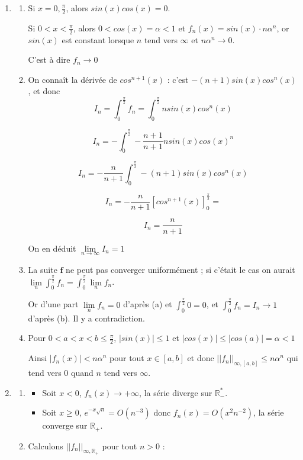 \documentclass[]{article}
\begin{document}
\begin{enumerate}

\item
\begin{enumerate}
	\item Si $x = 0, \frac{\pi}{2}$, alors $sin(x)cos(x) = 0$.
	
	Si $0 < x < \frac{\pi}{2}$, alors $0 < cos(x) = \alpha < 1$ et $f_n(x)=sin(x) \cdot n \alpha^n$, or $sin(x)$ est constant lorsque $n$ tend vers $\infty$ et $n \alpha^n \to 0$.
	
	C'est à dire $f_n \to 0$
	
	\item On connaît la dérivée de $cos^{n+1}(x)$ : c'est $-(n+1)sin(x)cos^n(x)$, et donc $$I_n = \int_{0}^{\frac{\pi}{2}}f_n = \int_{0}^{\frac{\pi}{2}}n sin(x) cos^n(x)$$
	
	$$I_n = - \int_{0}^{\frac{\pi}{2}}-\frac{n+1}{n+1} n sin(x) cos(x)^n$$
	
	$$I_n = -\frac{n}{n+1}\int_{0}^{\frac{\pi}{2}} - (n+1) sin(x) cos^n(x)$$
	
	$$I_n = - \frac{n}{n+1}[cos^{n+1}(x)]^{\frac{\pi}{2}}_0 = $$
	
	$$I_n=\frac{n}{n+1}$$
	
	On en déduit $\lim\limits_{n \to \infty} I_n = 1$
	
	\item La suite $\textbf{f}$ ne peut pas converger uniformément ; si c'était le cas on aurait $\displaystyle \lim\limits_{n} \int_{0}^{\frac{\pi}{2}}f_n = \int_{0}^{\frac{\pi}{2}} \lim\limits_{n}f_n$.
	
	Or d'une part $\displaystyle \lim\limits_{n} f_n = 0$ d'après (a) et $\displaystyle \int_{0}^{\frac{\pi}{2}} 0 = 0$, et $\displaystyle \int_{0}^{\frac{\pi}{2}} f_n = I_n \to 1$ d'après (b). Il y a contradiction.
	
	\item Pour $0 < a < x < b \leqslant \frac{\pi}{2}$, $|sin(x)| \leqslant 1$ et $|cos(x)| \leqslant |cos(a)| = \alpha < 1$
	
	Ainsi $|f_n(x)| < n \alpha^n$ pour tout $x \in [a, b]$ et donc $||f_n||_{\infty, [a,b]} \leqslant n \alpha^n$ qui tend vers 0 quand $n$ tend vers $\infty$.
\end{enumerate}

\item 
\begin{enumerate}
	\item
	\begin{itemize}
		\item Soit $x < 0$, $f_n(x) \to +\infty$, la série diverge sur $\mathbb{R}^*_-$.
		\item Soit $x \geqslant 0$, $e^{-x \sqrt{n}} = O(n^{-3})$ donc $f_n(x)=O(x^2 n^{-2})$, la série converge sur $\mathbb{R}_+$.
	\end{itemize}
	\item Calculons $||f_n||_{\infty, \mathbb{R_+}}$ pour tout $n > 0$ :
	

\end{enumerate}
\end{enumerate}
\end{document}
